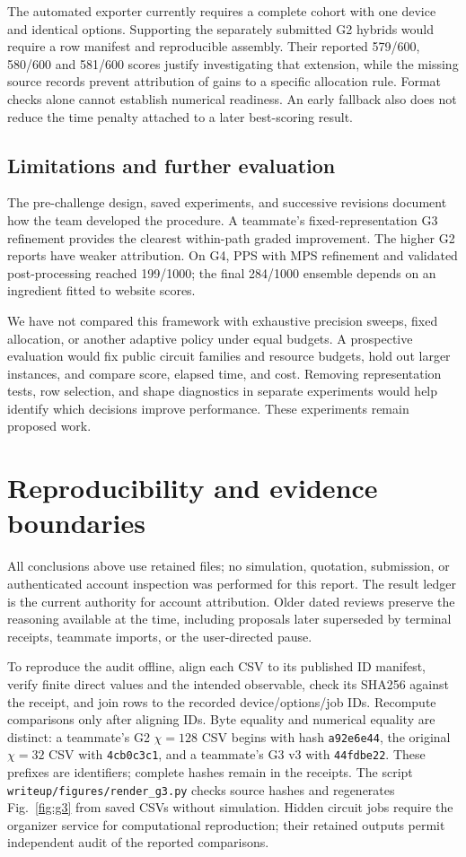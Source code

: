 \documentclass[11pt]{article}
\newcommand{\file}[1]{\nolinkurl{#1}}
\begin{document}
The automated exporter currently requires a complete cohort with one device and identical options. Supporting the separately submitted G2 hybrids would require a row manifest and reproducible assembly. Their reported 579/600, 580/600 and 581/600 scores justify investigating that extension, while the missing source records prevent attribution of gains to a specific allocation rule. Format checks alone cannot establish numerical readiness. An early fallback also does not reduce the time penalty attached to a later best-scoring result.\cite{ledger,workflow,rules}

\subsection{Limitations and further evaluation}
The pre-challenge design, saved experiments, and successive revisions document how the team developed the procedure. A teammate's fixed-representation G3 refinement provides the clearest within-path graded improvement. The higher G2 reports have weaker attribution. On G4, PPS with MPS refinement and validated post-processing reached 199/1000; the final 284/1000 ensemble depends on an ingredient fitted to website scores.

We have not compared this framework with exhaustive precision sweeps, fixed allocation, or another adaptive policy under equal budgets. A prospective evaluation would fix public circuit families and resource budgets, hold out larger instances, and compare score, elapsed time, and cost. Removing representation tests, row selection, and shape diagnostics in separate experiments would help identify which decisions improve performance. These experiments remain proposed work.

\newpage
\appendix
\section{Reproducibility and evidence boundaries}
All conclusions above use retained files; no simulation, quotation, submission, or authenticated account inspection was performed for this report. The result ledger is the current authority for account attribution. Older dated reviews preserve the reasoning available at the time, including proposals later superseded by terminal receipts, teammate imports, or the user-directed pause.

To reproduce the audit offline, align each CSV to its published ID manifest, verify finite direct values and the intended observable, check its SHA256 against the receipt, and join rows to the recorded device/options/job IDs. Recompute comparisons only after aligning IDs. Byte equality and numerical equality are distinct: a teammate's G2 $\chi=128$ CSV begins with hash \file{a92e6e44}, the original $\chi=32$ CSV with \file{4cb0c3c1}, and a teammate's G3 v3 with \file{44fdbe22}. These prefixes are identifiers; complete hashes remain in the receipts. The script \file{writeup/figures/render_g3.py} checks source hashes and regenerates Fig.~\ref{fig:g3} from saved CSVs without simulation. Hidden circuit jobs require the organizer service for computational reproduction; their retained outputs permit independent audit of the reported comparisons.
\end{document}
